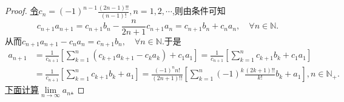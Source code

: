 \documentclass[../../main.tex]{subfiles}%
\begin{document}
\begin{proof}

\hyperlink{构造数列c_n的思路}{令\(c_n = (-1)^{n - 1}\frac{(2n - 1)!!}{(n - 1)!},n=1,2,\cdots\)},则由条件可知
\[
c_{n + 1}a_{n + 1}=c_{n + 1}b_n-\frac{n}{2n + 1}c_{n + 1}a_n=c_{n + 1}b_n + c_na_n, \quad \forall n\in \mathbb{N}.
\]
从而\(c_{n + 1}a_{n + 1}-c_na_n=c_{n + 1}b_n, \quad \forall n\in \mathbb{N}\).于是
\begin{align}
a_{n+1}&=\frac{1}{c_{n+1}}\left[ \sum_{k=1}^n{\left( c_{k+1}a_{k+1}-c_ka_k \right)}+c_1a_1 \right] =\frac{1}{c_{n+1}}\left[ \sum_{k=1}^n{c_{k+1}b_k}+c_1a_1 \right] 
\nonumber
\\
&=\frac{1}{c_{n+1}}\left[ \sum_{k=1}^n{c_{k+1}b_k}+a_1 \right] =\frac{\left( -1 \right) ^nn!}{\left( 2n+1 \right) !!}\left[ \sum_{k=1}^n{\left( -1 \right) ^k\frac{\left( 2k+1 \right) !!}{k!}b_k}+a_1 \right] ,n\in \mathbb{N} _+. \label{example4.44-1.1}
\end{align}
\hyperlink{example4.44解法的思路分析}{下面计算$\underset{n\rightarrow \infty}{\lim}a_n$.}


\end{proof}
\end{document}
